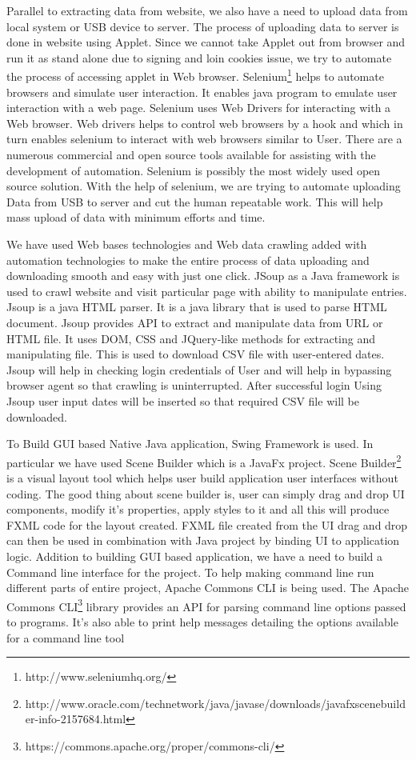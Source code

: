 \documentclass[article,type=msc,colorback,accentcolor=tud9c,twoside,11pt]{tudthesis}
\begin{document}
Parallel to extracting data from website, we also have a need to upload data from local system or USB device to server. The process of uploading data to server is done in website using Applet. Since we cannot take Applet\cite{Javaapplet} out from browser and run it as stand alone due to signing and loin cookies issue, we try to automate the process of accessing applet in Web browser. Selenium\footnote{http://www.seleniumhq.org/} helps to automate browsers and simulate user interaction. It enables java program to emulate user interaction with a web page. Selenium\cite{Webdriver} uses Web Drivers for interacting with a Web browser. Web drivers helps to control web browsers by a hook and which in turn enables selenium to interact with web browsers similar to User. There are a numerous commercial and open source tools available for assisting with the development of automation. Selenium is possibly the most widely used open source solution. With the help of selenium, we are trying to automate uploading Data from USB to server and cut the human repeatable work. This will help mass upload of data with minimum efforts and time.

We have used Web bases technologies and Web data crawling added with automation technologies to make the entire process of data uploading and downloading smooth and easy with just one click. JSoup\cite{Jsoup} as a Java framework is used to crawl website and visit particular page with ability to manipulate entries. Jsoup is a java HTML parser. It is a java library that is used to parse HTML\cite{BeaqleJSHTML} document. Jsoup provides API to extract and manipulate data from URL or HTML file. It uses DOM, CSS and JQuery-like methods for extracting and manipulating file. This is used to download CSV file with user-entered dates. Jsoup will help in checking login credentials of User and will help in bypassing browser agent so that crawling is uninterrupted. After successful login Using Jsoup user input dates will be inserted so that required CSV file will be downloaded. 

To Build GUI based Native Java application, Swing Framework is used. In particular we have used Scene Builder which is a JavaFx\cite{JavaFx} project. Scene Builder\footnote{http://www.oracle.com/technetwork/java/javase/downloads/javafxscenebuilder-info-2157684.html} is a visual layout tool which helps user build application user interfaces without coding. The good thing about scene builder is, user can simply drag and drop UI components, modify it's properties, apply styles to it and all this will produce FXML code for the layout created. FXML file created from the UI drag and drop can then be used in combination with Java project by binding UI to application logic. Addition to building GUI based application, we have a need to build a Command line interface for the project. To help making command line run different parts of entire project, Apache Commons CLI is being used. The Apache Commons CLI\footnote{https://commons.apache.org/proper/commons-cli/} library provides an API for parsing command line options passed to programs. It's also able to print help messages detailing the options available for a command line tool
\end{document}
